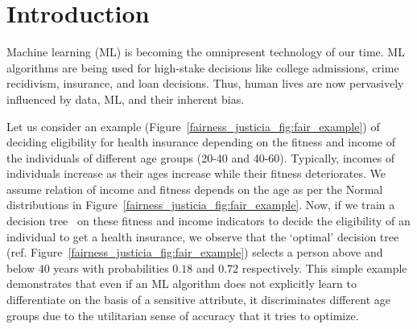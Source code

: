 \section{Introduction}
Machine learning (ML) is becoming the omnipresent technology of our time. 
ML algorithms are being used for high-stake decisions like college admissions, crime recidivism, insurance, and loan decisions.
Thus, human lives are now pervasively influenced by data, ML, and their inherent bias.

\begin{example}\label{fairness_justicia_example:intro}
Let us consider an example (Figure~\ref{fairness_justicia_fig:fair_example}) of deciding eligibility for health insurance depending on the fitness and income of the individuals of different age groups (20-40 and 40-60).
Typically, incomes of individuals increase as their ages increase while their fitness deteriorates.
We assume relation of income and fitness depends on the age as per the Normal distributions in Figure~\ref{fairness_justicia_fig:fair_example}.
Now, if we train a decision tree~\cite{narodytska2018learning} on these fitness and income indicators to decide the eligibility of an individual to get a health insurance, we observe that the `optimal' decision tree (ref. Figure~\ref{fairness_justicia_fig:fair_example}) selects a person above and below $40$ years with probabilities $0.18$ and $0.72$ respectively.
This simple example demonstrates that even if an ML algorithm does not explicitly learn to differentiate on the basis of a sensitive attribute, it discriminates different age groups due to the utilitarian sense of accuracy that it tries to optimize.
\end{example}

